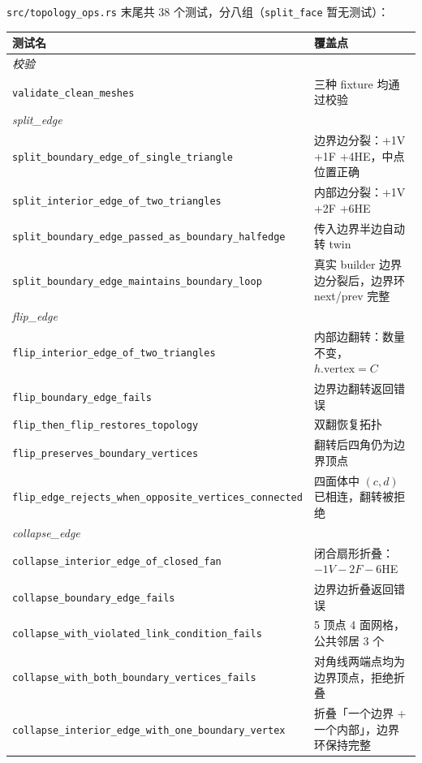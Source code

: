 \documentclass[11pt,a4paper]{article}
\begin{document}
\texttt{src/topology\_ops.rs} 末尾共 38 个测试，分八组（\texttt{split\_face} 暂无测试）：

\begin{center}
\scriptsize
\renewcommand{\arraystretch}{1.18}
\begin{longtable}{@{}ll@{}}
  \toprule
  \textbf{测试名} & \textbf{覆盖点} \\
  \midrule
  \multicolumn{2}{l}{\textit{校验}} \\
  \texttt{validate\_clean\_meshes} & 三种 fixture 均通过校验 \\
  \midrule
  \multicolumn{2}{l}{\textit{split\_edge}} \\
  \texttt{split\_boundary\_edge\_of\_single\_triangle} & 边界边分裂：+1V +1F +4HE，中点位置正确 \\
  \texttt{split\_interior\_edge\_of\_two\_triangles}   & 内部边分裂：+1V +2F +6HE \\
  \texttt{split\_boundary\_edge\_passed\_as\_boundary\_halfedge} & 传入边界半边自动转 twin \\
  \texttt{split\_boundary\_edge\_maintains\_boundary\_loop} & 真实 builder 边界边分裂后，边界环 next/prev 完整 \\
  \midrule
  \multicolumn{2}{l}{\textit{flip\_edge}} \\
  \texttt{flip\_interior\_edge\_of\_two\_triangles} & 内部边翻转：数量不变，$h.\mathrm{vertex}=C$ \\
  \texttt{flip\_boundary\_edge\_fails}              & 边界边翻转返回错误 \\
  \texttt{flip\_then\_flip\_restores\_topology}     & 双翻恢复拓扑 \\
  \texttt{flip\_preserves\_boundary\_vertices}      & 翻转后四角仍为边界顶点 \\
  \texttt{flip\_edge\_rejects\_when\_opposite\_vertices\_connected} & 四面体中 $(c,d)$ 已相连，翻转被拒绝 \\
  \midrule
  \multicolumn{2}{l}{\textit{collapse\_edge}} \\
  \texttt{collapse\_interior\_edge\_of\_closed\_fan} & 闭合扇形折叠：$-1V -2F -6$HE \\
  \texttt{collapse\_boundary\_edge\_fails}           & 边界边折叠返回错误 \\
  \texttt{collapse\_with\_violated\_link\_condition\_fails} & 5 顶点 4 面网格，公共邻居 3 个 \\
  \texttt{collapse\_with\_both\_boundary\_vertices\_fails} & 对角线两端点均为边界顶点，拒绝折叠 \\
  \texttt{collapse\_interior\_edge\_with\_one\_boundary\_vertex} & 折叠「一个边界 + 一个内部」，边界环保持完整 \\

\end{longtable}
\end{center}
\end{document}
